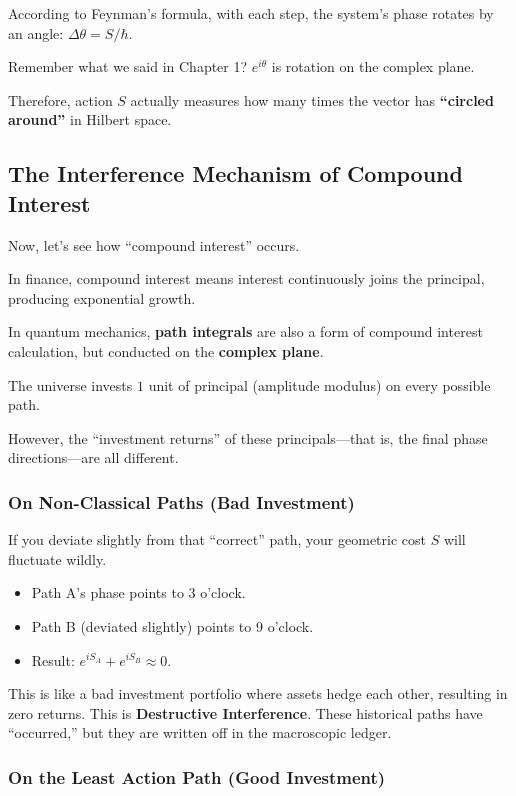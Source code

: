 According to Feynman's formula, with each step, the system's phase rotates by an angle: $\Delta \theta = S / \hbar$.

Remember what we said in Chapter 1? $e^{i\theta}$ is rotation on the complex plane.

Therefore, action $S$ actually measures how many times the vector has \textbf{``circled around''} in Hilbert space.

\subsection{The Interference Mechanism of Compound Interest}

Now, let's see how ``compound interest'' occurs.

In finance, compound interest means interest continuously joins the principal, producing exponential growth.

In quantum mechanics, \textbf{path integrals} are also a form of compound interest calculation, but conducted on the \textbf{complex plane}.

The universe invests $1$ unit of principal (amplitude modulus) on every possible path.

However, the ``investment returns'' of these principals---that is, the final phase directions---are all different.

\subsubsection{On Non-Classical Paths (Bad Investment)}

If you deviate slightly from that ``correct'' path, your geometric cost $S$ will fluctuate wildly.

\begin{itemize}
\item Path A's phase points to 3 o'clock.

\item Path B (deviated slightly) points to 9 o'clock.

\item Result: \textbf{$e^{iS_A} + e^{iS_B} \approx 0$}.
\end{itemize}

This is like a bad investment portfolio where assets hedge each other, resulting in zero returns. This is \textbf{Destructive Interference}. These historical paths have ``occurred,'' but they are written off in the macroscopic ledger.

\subsubsection{On the Least Action Path (Good Investment)}

